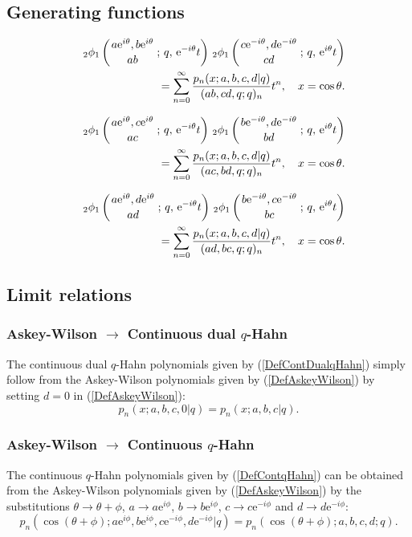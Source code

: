 \documentclass[envcountchap,graybox]{svmono}
\newcounter{rom}
\newcommand{\qhyp}[5]{\mbox{}_{#1}{\phi}_{#2}
\left(\genfrac{}{}{0pt}{}{#3}{#4}\,;\,q,\,#5\right)}
\newcommand{\e}{\textrm{e}}
\begin{document}
\subsection*{Generating functions}
\begin{eqnarray}
\label{GenAskeyWilson1}
& &\qhyp{2}{1}{a\e^{i\theta},b\e^{i\theta}}{ab}{\e^{-i\theta}t}\,
\qhyp{2}{1}{c\e^{-i\theta},d\e^{-i\theta}}{cd}{\e^{i\theta}t}\nonumber\\
& &{}=\sum_{n=0}^{\infty}\frac{p_n(x;a,b,c,d|q)}{(ab,cd,q;q)_n}t^n,
\quad x=\cos\theta.
\end{eqnarray}

\begin{eqnarray}
\label{GenAskeyWilson2}
& &\qhyp{2}{1}{a\e^{i\theta},c\e^{i\theta}}{ac}{\e^{-i\theta}t}\,
\qhyp{2}{1}{b\e^{-i\theta},d\e^{-i\theta}}{bd}{\e^{i\theta}t}\nonumber\\
& &{}=\sum_{n=0}^{\infty}\frac{p_n(x;a,b,c,d|q)}{(ac,bd,q;q)_n}t^n,
\quad x=\cos\theta.
\end{eqnarray}

\begin{eqnarray}
\label{GenAskeyWilson3}
& &\qhyp{2}{1}{a\e^{i\theta},d\e^{i\theta}}{ad}{\e^{-i\theta}t}\,
\qhyp{2}{1}{b\e^{-i\theta},c\e^{-i\theta}}{bc}{\e^{i\theta}t}\nonumber\\
& &{}=\sum_{n=0}^{\infty}\frac{p_n(x;a,b,c,d|q)}{(ad,bc,q;q)_n}t^n,
\quad x=\cos\theta.
\end{eqnarray}

\subsection*{Limit relations}

\subsubsection*{Askey-Wilson $\rightarrow$ Continuous dual $q$-Hahn}
The continuous dual $q$-Hahn polynomials given by (\ref{DefContDualqHahn}) simply follow
from the Askey-Wilson polynomials given by (\ref{DefAskeyWilson}) by setting
$d=0$ in (\ref{DefAskeyWilson}):
\begin{equation}
p_n(x;a,b,c,0|q)=p_n(x;a,b,c|q).
\end{equation}

\subsubsection*{Askey-Wilson $\rightarrow$ Continuous $q$-Hahn}
The continuous $q$-Hahn polynomials given by (\ref{DefContqHahn}) can be obtained
from the Askey-Wilson polynomials given by (\ref{DefAskeyWilson}) by the substitutions
$\theta\rightarrow\theta+\phi$, $a\rightarrow a\e^{i\phi}$, $b\rightarrow b\e^{i\phi}$,
$c\rightarrow c\e^{-i\phi}$ and $d\rightarrow d\e^{-i\phi}$:
\begin{equation}
p_n(\cos(\theta+\phi);a\e^{i\phi},b\e^{i\phi},c\e^{-i\phi},d\e^{-i\phi}|q)=p_n(\cos(\theta+\phi);a,b,c,d;q).
\end{equation}
\end{document}
